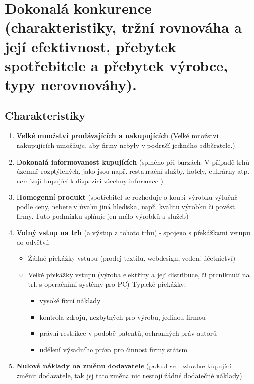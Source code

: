 \clearpage
\section{Dokonalá konkurence (charakteristiky, tržní rovnováha a její efektivnost, přebytek
spotřebitele a přebytek výrobce, typy nerovnováhy).}

\subsection{Charakteristiky}
\begin{enumerate}
    \item \textbf{Velké množství prodávajících a nakupujících} (Velké množství nakupujících 
    umožňuje, aby firmy nebyly v područí jediného odběratele.)
    \item \textbf{Dokonalá informovanost kupujících} (splněno při burzách. V případě trhů 
    územně rozptýlených, jako jsou např. restaurační služby, hotely, cukrárny atp. nemívají
    kupující k dispozici všechny informace )
    \item \textbf{Homogenní produkt} (spotřebitel se rozhoduje o koupi výrobku výlučně podle
    ceny, nebere v úvahu jiná hlediska, např. kvalitu výrobku či pověst firmy. Tuto podmínku
    splňuje jen málo výrobků a služeb)
    \item \textbf{Volný vstup na trh} (a výstup z tohoto trhu) - spojeno s překážkami vstupu do odvětví.
    \begin{itemize}
        \item Žádné překážky vstupu (prodej textilu, webdesign, vedení účetnictví)
        \item Velké překážky vstupu (výroba elektřiny a její distribuce, či proniknutí
        na trh s operačními systémy pro PC) Typické překážky:
        \begin{itemize}
            \item vysoké fixní náklady
            \item kontrola zdrojů, nezbytných pro výrobu, jedinou firmou
            \item právní restrikce v podobě patentů, ochranných práv autorů
            \item udělení výsadního práva pro činnost firmy státem
        \end{itemize}
    \end{itemize}
    \item \textbf{Nulové náklady na změnu dodavatele} (pokud se rozhodne kupující změnit 
    dodavatele, tak jej tato změna nic nestojí žádné dodatečné náklady)
\end{enumerate}

